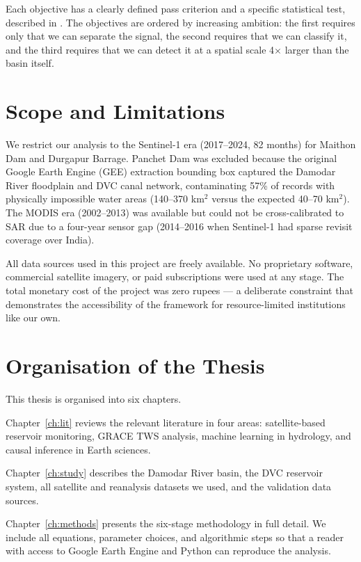 \documentclass[12pt,a4paper,oneside]{report}
\begin{document}
Each objective has a clearly defined pass criterion and a specific statistical
test, described in . The objectives are ordered by
increasing ambition: the first requires only that we can separate the signal,
the second requires that we can classify it, and the third requires that we
can detect it at a spatial scale 4$\times$ larger than the basin itself.

\section{Scope and Limitations}

We restrict our analysis to the Sentinel-1 era (2017--2024, 82 months) for
Maithon Dam and Durgapur Barrage. Panchet Dam was excluded because the
original Google Earth Engine (GEE) extraction bounding box captured the
Damodar River floodplain and DVC canal network, contaminating 57\% of
records with physically impossible water areas (140--370 km$^2$ versus the
expected 40--70 km$^2$). The MODIS era (2002--2013) was available but could
not be cross-calibrated to SAR due to a four-year sensor gap (2014--2016
when Sentinel-1 had sparse revisit coverage over India).

All data sources used in this project are freely available. No proprietary
software, commercial satellite imagery, or paid subscriptions were used at
any stage. The total monetary cost of the project was zero rupees --- a
deliberate constraint that demonstrates the accessibility of the framework
for resource-limited institutions like our own.

\section{Organisation of the Thesis}

This thesis is organised into six chapters.

Chapter~\ref{ch:lit} reviews the relevant literature in four areas:
satellite-based reservoir monitoring, GRACE TWS analysis, machine learning
in hydrology, and causal inference in Earth sciences.

Chapter~\ref{ch:study} describes the Damodar River basin, the DVC reservoir
system, all satellite and reanalysis datasets we used, and the validation
data sources.

Chapter~\ref{ch:methods} presents the six-stage methodology in full detail.
We include all equations, parameter choices, and algorithmic steps so that a
reader with access to Google Earth Engine and Python can reproduce the
analysis.
\end{document}
